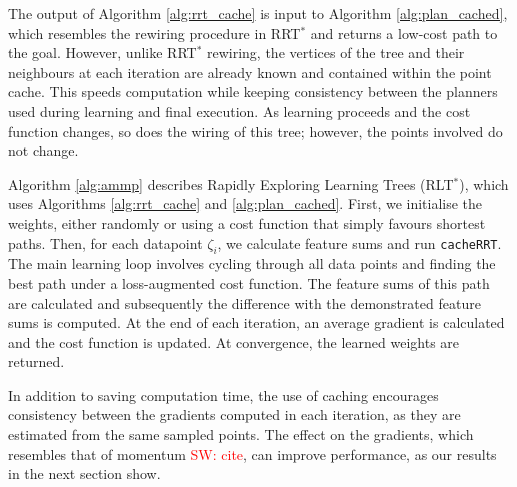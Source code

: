 \documentclass{article}  %
\newcommand{\sw}[1]{\textcolor{red}{SW: #1}}
\begin{document}
The output of Algorithm \ref{alg:rrt_cache} is input to Algorithm \ref{alg:plan_cached}, which resembles the rewiring procedure in RRT$^*$ \cite{karaman2011sampling} and returns a low-cost path to the goal. However, unlike RRT$^*$ rewiring, the vertices of the tree and their neighbours at each iteration are already known and contained within the point cache. This speeds computation while keeping consistency between the planners used during learning and final execution. As learning proceeds and the cost function changes, so does the wiring of this tree; however, the points involved do not change. %

Algorithm \ref{alg:ammp} describes Rapidly Exploring Learning Trees (RLT$^*$), which uses Algorithms \ref{alg:rrt_cache} and \ref{alg:plan_cached}. First, we initialise the weights, either randomly or using a cost function that simply favours shortest paths. Then, for each datapoint $\zeta_i$, we calculate feature sums and run \texttt{cacheRRT}. The main learning loop involves cycling through all data points and finding the best path under a loss-augmented cost function. The feature sums of this path are calculated and subsequently the difference with the demonstrated feature sums is computed. At the end of each iteration, an average gradient is calculated and the cost function is updated. At convergence, the learned weights are returned.

In addition to saving computation time, the use of caching encourages consistency between the gradients computed in each iteration, as they are estimated from the same sampled points.  The effect on the gradients, which resembles that of momentum \sw{cite}, can improve performance, as our results in the next section show.
\end{document}
